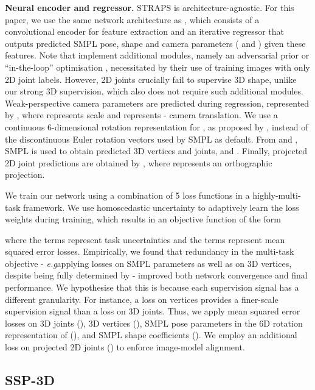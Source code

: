 \documentclass{bmvc2k}
\def\eg{\emph{e.g}\bmvaOneDot}
\begin{document}
\noindent \textbf{Neural encoder and regressor.} STRAPS is architecture-agnostic. For this paper, we use the same network architecture as \cite{hmrKanazawa17, kolotouros2019spin}, which consists of a convolutional encoder for feature extraction and an iterative regressor that outputs predicted SMPL pose, shape and camera parameters ( and ) given these features. Note that \cite{hmrKanazawa17, kolotouros2019spin} implement additional modules, namely an adversarial prior \cite{hmrKanazawa17} or “in-the-loop” optimisation \cite{kolotouros2019spin}, necessitated by their use of training images with only 2D joint labels. However, 2D joints crucially fail to supervise 3D shape, unlike our strong 3D supervision, which also does not require such additional modules. Weak-perspective camera parameters are predicted during regression, represented by , where  represents scale and  represents - camera translation. We use a continuous 6-dimensional rotation representation for  , as proposed by \cite{Zhou_2019_CVPR}, instead of the discontinuous Euler rotation vectors used by SMPL as default. From  and , SMPL is used to obtain predicted 3D vertices and joints,  and . Finally, projected 2D joint predictions are obtained by , where  represents an orthographic projection.

We train our network using a combination of 5 loss functions in a highly-multi-task framework. We use homoscedastic uncertainty \cite{kendall2017multi} to adaptively learn the loss weights during training, which results in an objective function of the form
\vspace{-0.25cm}

where the  terms represent task uncertainties and the  terms represent mean squared error losses. Empirically, we found that redundancy in the multi-task objective - \eg applying losses on SMPL parameters as well as on 3D vertices, despite  being fully determined by  - improved both network convergence and final performance. We hypothesise that this is because each supervision signal has a different granularity. For instance, a loss on vertices provides a finer-scale supervision signal than a loss on 3D joints. Thus, we apply mean squared error losses on 3D joints (), 3D vertices (), SMPL pose parameters in the 6D rotation representation of \cite{Zhou_2019_CVPR} (), and SMPL shape coefficients (). We employ an additional loss on projected 2D joints () to enforce image-model alignment. 

\subsection{SSP-3D}
\end{document}
